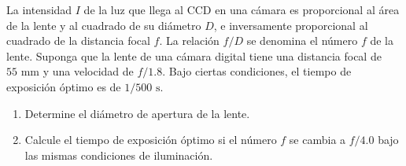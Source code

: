 \item La intensidad $I$ de la luz que llega al CCD en una cámara es proporcional al área de la lente y al cuadrado de su diámetro $D$, e inversamente proporcional al cuadrado de la distancia focal $f$. La relación $f/D$ se denomina el número $f$ de la lente. Suponga que la lente de una cámara digital tiene una distancia focal de $55\text{ mm}$ y una velocidad de $f/1.8$. Bajo ciertas condiciones, el tiempo de exposición óptimo es de $1/500\text{ s}$.
\begin{enumerate}
    \item Determine el diámetro de apertura de la lente.
    \item Calcule el tiempo de exposición óptimo si el número $f$ se cambia a $f/4.0$ bajo las mismas condiciones de iluminación.
\end{enumerate}